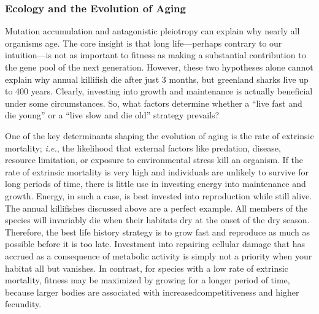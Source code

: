 \documentclass[
]{book}
\begin{document}
\hypertarget{ecology-and-the-evolution-of-aging}{%
\subsubsection*{Ecology and the Evolution of Aging}\label{ecology-and-the-evolution-of-aging}}

Mutation accumulation and antagonistic pleiotropy can explain why nearly all organisms age. The core insight is that long life---perhaps contrary to our intuition---is not as important to fitness as making a substantial contribution to the gene pool of the next generation. However, these two hypotheses alone cannot explain why annual killifish die after just 3 months, but greenland sharks live up to 400 years. Clearly, investing into growth and maintenance is actually beneficial under some circumstances. So, what factors determine whether a ``live fast and die young'' or a ``live slow and die old'' strategy prevails?

One of the key determinants shaping the evolution of aging is the rate of extrinsic mortality; \emph{i.e.}, the likelihood that external factors like predation, disease, resource limitation, or exposure to environmental stress kill an organism. If the rate of extrinsic mortality is very high and individuals are unlikely to survive for long periods of time, there is little use in investing energy into maintenance and growth. Energy, in such a case, is best invested into reproduction while still alive. The annual killifishes discussed above are a perfect example. All members of the species will invariably die when their habitats dry at the onset of the dry season. Therefore, the best life history strategy is to grow fast and reproduce as much as possible before it is too late. Investment into repairing cellular damage that has accrued as a consequence of metabolic activity is simply not a priority when your habitat all but vanishes. In contrast, for species with a low rate of extrinsic mortality, fitness may be maximized by growing for a longer period of time, because larger bodies are associated with increasedcompetitiveness and higher fecundity.
\end{document}
